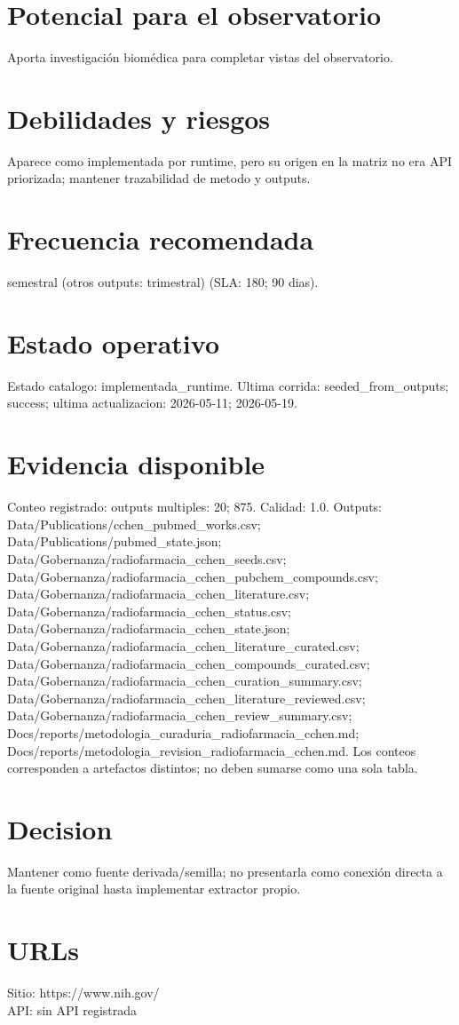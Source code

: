 \documentclass[10pt,a4paper]{article}
\begin{document}
\section*{Potencial para el observatorio}
Aporta investigación biomédica para completar vistas del observatorio.

\section*{Debilidades y riesgos}
Aparece como implementada por runtime, pero su origen en la matriz no era API priorizada; mantener trazabilidad de metodo y outputs.

\section*{Frecuencia recomendada}
semestral (otros outputs: trimestral) (SLA: 180; 90 dias).

\section*{Estado operativo}
Estado catalogo: implementada\_runtime. Ultima corrida: seeded\_from\_outputs; success; ultima actualizacion: 2026-05-11; 2026-05-19.

\section*{Evidencia disponible}
Conteo registrado: outputs multiples: 20; 875. Calidad: 1.0. Outputs: Data/Publications/cchen\_pubmed\_works.csv; Data/Publications/pubmed\_state.json; Data/Gobernanza/radiofarmacia\_cchen\_seeds.csv; Data/Gobernanza/radiofarmacia\_cchen\_pubchem\_compounds.csv; Data/Gobernanza/radiofarmacia\_cchen\_literature.csv; Data/Gobernanza/radiofarmacia\_cchen\_status.csv; Data/Gobernanza/radiofarmacia\_cchen\_state.json; Data/Gobernanza/radiofarmacia\_cchen\_literature\_curated.csv; Data/Gobernanza/radiofarmacia\_cchen\_compounds\_curated.csv; Data/Gobernanza/radiofarmacia\_cchen\_curation\_summary.csv; Data/Gobernanza/radiofarmacia\_cchen\_literature\_reviewed.csv; Data/Gobernanza/radiofarmacia\_cchen\_review\_summary.csv; Docs/reports/metodologia\_curaduria\_radiofarmacia\_cchen.md; Docs/reports/metodologia\_revision\_radiofarmacia\_cchen.md. Los conteos corresponden a artefactos distintos; no deben sumarse como una sola tabla.

\section*{Decision}
Mantener como fuente derivada/semilla; no presentarla como conexión directa a la fuente original hasta implementar extractor propio.


\section*{URLs}
Sitio: https://www.nih.gov/\\
API: sin API registrada
\end{document}
